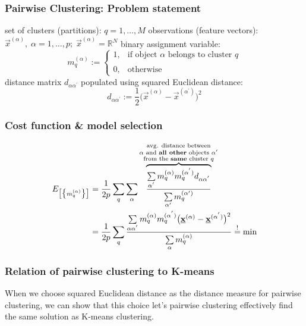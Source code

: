 \begin{frame}
\frametitle{Pairwise Clustering: Problem statement}

\begin{itemize}
\itr set of clusters (partitions): $q = 1, \ldots, M$
\itr observations (feature vectors): $\vec{x}^{(\alpha)}, \; 
\alpha = 1, \ldots, p; \; \vec{x}^{(\alpha)} = \mathbb{R}^N$
\itr binary assignment variable:
$$ m_q^{(\alpha)} := \left\{ \begin{array}{ll}
		1, & \text{if object } \alpha \text{ belongs to cluster } q \\\\
		0, & \text{otherwise}
	\end{array} \right.
$$
\itr distance matrix $d_{\alpha \alpha^{'}}$ populated using squared Euclidean distance:
$$
	d_{\alpha \alpha^{'}} := \frac{1}{2} \big( \vec{x}^{(\alpha)} 
		- \vec{x}^{(\alpha^{'})} \big)^2
$$
\end{itemize}
\end{frame}
\begin{frame}
\frametitle{Cost function \& model selection}
\begin{align}
E_{ \big[ \big\{ m_q^{(\alpha)} \big\} \big] }
	&= \frac{1}{2p} \sum\limits_q \sum\limits_{\alpha}
	 \overbrace{ \frac{\sum\limits_{\alpha^{'}} 
		m_q^{(\alpha)}m_q^{(\alpha^{'})} d_{\alpha \alpha^{'}}}{
                \sum\limits_{\alpha'} m_q^{(\alpha')}
		}}^{ \substack{	\text{avg. distance between} \\
				\alpha \text{ and \textbf{all other} objects $\alpha'$} \\
				\text{from the \textbf{same} cluster } q}}\\
&= \frac{1}{2p} \sum\limits_q \frac{ \sum\limits_{\alpha \alpha^{'}}
		m_q^{(\alpha)} m_q^{(\alpha^{'})} \big( \underline{\mathbf{x}}^{(\alpha)}
		-\underline{\mathbf{x}}^{(\alpha^{'})} \big)^2 }{
			\sum\limits_{\alpha} m_q^{(\alpha)}}
	\stackrel{\mathrm{!}}{=} \min
\end{align}
            
\end{frame}

\begin{frame}\frametitle{Relation of pairwise clustering to K-means}

When we choose squared Euclidean distance as the distance measure for pairwise clustering, we can show that this choice let's pairwise clustering effectively find the same solution as K-means clustering.

\end{frame}

